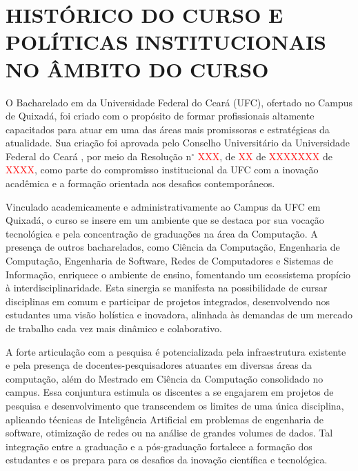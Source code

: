 \chapter{HISTÓRICO DO CURSO E POLÍTICAS INSTITUCIONAIS NO ÂMBITO DO CURSO}
\label{cap:historico-do-curso}

O Bacharelado em \nomedocurso da Universidade Federal do Ceará (UFC), ofertado no Campus de Quixadá, foi criado com o propósito de formar profissionais altamente capacitados para atuar em uma das áreas mais promissoras e estratégicas da atualidade. Sua criação foi aprovada pelo Conselho Universitário da Universidade Federal do Ceará , por meio da Resolução n$^\circ$ \textcolor{red}{XXX}, de \textcolor{red}{XX} de \textcolor{red}{XXXXXXX} de \textcolor{red}{XXXX}, como parte do compromisso institucional da UFC com a inovação acadêmica e a formação orientada aos desafios contemporâneos.


Vinculado academicamente e administrativamente ao Campus da UFC em Quixadá, o curso se insere em um ambiente que se destaca por sua vocação tecnológica e pela concentração de graduações na área da Computação. A presença de outros bacharelados, como Ciência da Computação, Engenharia de Computação, Engenharia de Software, Redes de Computadores e Sistemas de Informação, enriquece o ambiente de ensino, fomentando um ecossistema propício à interdisciplinaridade. Esta sinergia se manifesta na possibilidade de cursar disciplinas em comum e participar de projetos integrados, desenvolvendo nos estudantes uma visão holística e inovadora, alinhada às demandas de um mercado de trabalho cada vez mais dinâmico e colaborativo.

A forte articulação com a pesquisa é potencializada pela infraestrutura existente e pela presença de docentes-pesquisadores atuantes em diversas áreas da computação, além do Mestrado em Ciência da Computação consolidado no campus. Essa conjuntura estimula os discentes a se engajarem em projetos de pesquisa e desenvolvimento que transcendem os limites de uma única disciplina, aplicando técnicas de Inteligência Artificial em problemas de engenharia de software, otimização de redes ou na análise de grandes volumes de dados. Tal integração entre a graduação e a pós-graduação fortalece a formação dos estudantes e os prepara para os desafios da inovação científica e tecnológica.

